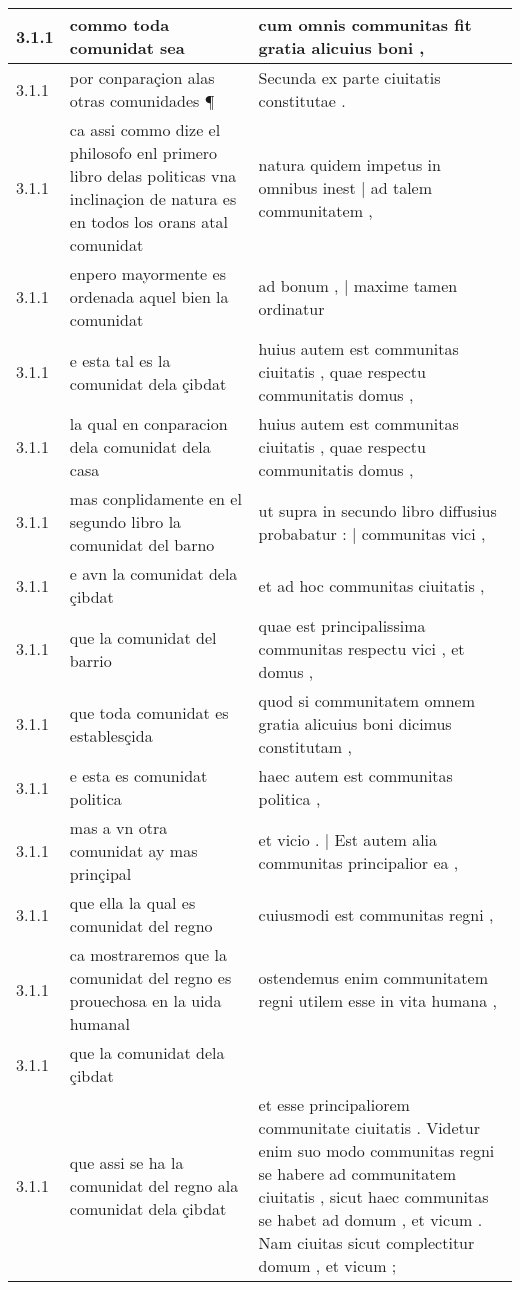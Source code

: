 \begin{tabular}{|p{1cm}|p{6.5cm}|p{6.5cm}|}
3.1.1 & commo toda comunidat sea & cum omnis communitas fit gratia alicuius boni , \\\hline
3.1.1 & por conparaçion alas otras comunidades ¶ & Secunda ex parte ciuitatis constitutae . \\\hline
3.1.1 & ca assi commo dize el philosofo enl primero libro delas politicas vna inclinaçion de natura es en todos los orans atal comunidat & natura quidem impetus in omnibus inest | ad talem communitatem , \\\hline
3.1.1 & enpero mayormente es ordenada aquel bien la comunidat & ad bonum , | maxime tamen ordinatur \\\hline
3.1.1 & e esta tal es la comunidat dela çibdat & huius autem est communitas ciuitatis , quae respectu communitatis domus , \\\hline
3.1.1 & la qual en conparacion dela comunidat dela casa & huius autem est communitas ciuitatis , quae respectu communitatis domus , \\\hline
3.1.1 & mas conplidamente en el segundo libro la comunidat del barno & ut supra in secundo libro diffusius probabatur : | communitas vici , \\\hline
3.1.1 & e avn la comunidat dela çibdat & et ad hoc communitas ciuitatis , \\\hline
3.1.1 & que la comunidat del barrio & quae est principalissima communitas respectu vici , et domus , \\\hline
3.1.1 & que toda comunidat es establesçida & quod si communitatem omnem gratia alicuius boni dicimus constitutam , \\\hline
3.1.1 & e esta es comunidat politica & haec autem est communitas politica , \\\hline
3.1.1 & mas a vn otra comunidat ay mas prinçipal & et vicio . | Est autem alia communitas principalior ea , \\\hline
3.1.1 & que ella la qual es comunidat del regno & cuiusmodi est communitas regni , \\\hline
3.1.1 & ca mostraremos que la comunidat del regno es prouechosa en la uida humanal & ostendemus enim communitatem regni utilem esse in vita humana , \\\hline
3.1.1 & que la comunidat dela çibdat &  \\\hline
3.1.1 & que assi se ha la comunidat del regno ala comunidat dela çibdat & et esse principaliorem communitate ciuitatis . Videtur enim suo modo communitas regni se habere ad communitatem ciuitatis , sicut haec communitas se habet ad domum , et vicum . Nam ciuitas sicut complectitur domum , et vicum ; \\\hline

\end{tabular}
